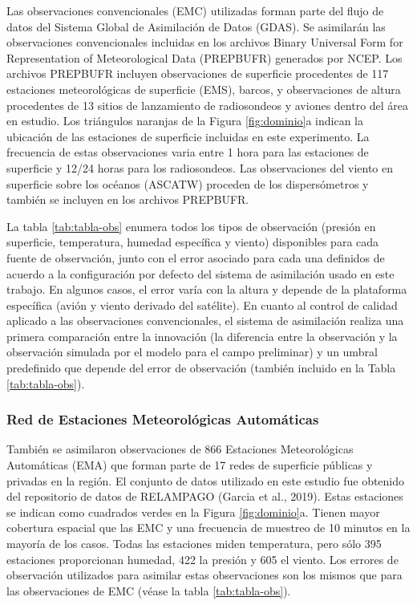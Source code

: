 \documentclass[12pt,oneside,a4paper]{reedthesis}
\begin{document}
Las observaciones convencionales (EMC) utilizadas forman parte del flujo de datos del Sistema Global de Asimilación de Datos (GDAS). Se asimilarán las observaciones convencionales incluidas en los archivos Binary Universal Form for Representation of Meteorological Data (PREPBUFR) generados por NCEP. Los archivos PREPBUFR incluyen observaciones de superficie procedentes de 117 estaciones meteorológicas de superficie (EMS), barcos, y observaciones de altura procedentes de 13 sitios de lanzamiento de radiosondeos y aviones dentro del área en estudio. Los triángulos naranjas de la Figura \ref{fig:dominio}a indican la ubicación de las estaciones de superficie incluidas en este experimento. La frecuencia de estas observaciones varia entre 1 hora para las estaciones de superficie y 12/24 horas para los radiosondeos. Las observaciones del viento en superficie sobre los océanos (ASCATW) proceden de los dispersómetros y también se incluyen en los archivos PREPBUFR.

La tabla \ref{tab:tabla-obs} enumera todos los tipos de observación (presión en superficie, temperatura, humedad específica y viento) disponibles para cada fuente de observación, junto con el error asociado para cada una definidos de acuerdo a la configuración por defecto del sistema de asimilación usado en este trabajo. En algunos casos, el error varía con la altura y depende de la plataforma específica (avión y viento derivado del satélite). En cuanto al control de calidad aplicado a las observaciones convencionales, el sistema de asimilación realiza una primera comparación entre la innovación (la diferencia entre la observación y la observación simulada por el modelo para el campo preliminar) y un umbral predefinido que depende del error de observación (también incluido en la Tabla \ref{tab:tabla-obs}).

\hypertarget{ema}{%
\subsubsection{Red de Estaciones Meteorológicas Automáticas}\label{ema}}

También se asimilaron observaciones de 866 Estaciones Meteorológicas Automáticas (EMA) que forman parte de 17 redes de superficie públicas y privadas en la región. El conjunto de datos utilizado en este estudio fue obtenido del repositorio de datos de RELAMPAGO (Garcia et al., 2019). Estas estaciones se indican como cuadrados verdes en la Figura \ref{fig:dominio}a. Tienen mayor cobertura espacial que las EMC y una frecuencia de muestreo de 10 minutos en la mayoría de los casos. Todas las estaciones miden temperatura, pero sólo 395 estaciones proporcionan humedad, 422 la presión y 605 el viento.
Los errores de observación utilizados para asimilar estas observaciones son los mismos que para las observaciones de EMC (véase la tabla \ref{tab:tabla-obs}).
\end{document}
